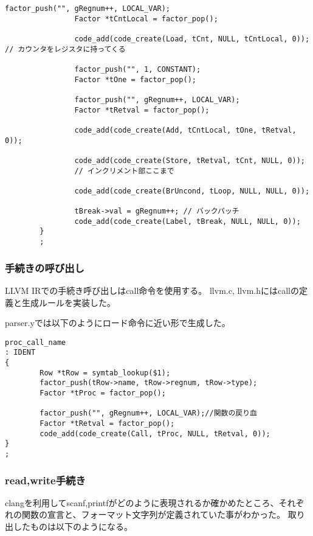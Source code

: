\begin{lstlisting}[caption={for文の生成箇所},label={for文の生成箇所}]
                factor_push("", gRegnum++, LOCAL_VAR);
                Factor *tCntLocal = factor_pop();

                code_add(code_create(Load, tCnt, NULL, tCntLocal, 0)); // カウンタをレジスタに持ってくる

                factor_push("", 1, CONSTANT);
                Factor *tOne = factor_pop();

                factor_push("", gRegnum++, LOCAL_VAR);
                Factor *tRetval = factor_pop();

                code_add(code_create(Add, tCntLocal, tOne, tRetval, 0));

                code_add(code_create(Store, tRetval, tCnt, NULL, 0));
                // インクリメント部ここまで

                code_add(code_create(BrUncond, tLoop, NULL, NULL, 0));

                tBreak->val = gRegnum++; // バックパッチ
                code_add(code_create(Label, tBreak, NULL, NULL, 0));
        }
        ;
\end{lstlisting}

\subsubsection{手続きの呼び出し}
LLVM IRでの手続き呼び出しはcall命令を使用する。
llvm.c, llvm.hにはcallの定義と生成ルールを実装した。

parser.yでは以下のようにロード命令に近い形で生成した。

\begin{lstlisting}[caption={手続きの呼び出し生成部分},label={手続きの呼び出し生成部分}]
proc_call_name
: IDENT
{
        Row *tRow = symtab_lookup($1);
        factor_push(tRow->name, tRow->regnum, tRow->type);
        Factor *tProc = factor_pop();

        factor_push("", gRegnum++, LOCAL_VAR);//関数の戻り血
        Factor *tRetval = factor_pop();
        code_add(code_create(Call, tProc, NULL, tRetval, 0));
}
;
\end{lstlisting}

\subsubsection{read,write手続き}
clangを利用してscanf,printfがどのように表現されるか確かめたところ、それぞれの関数の宣言と、フォーマット文字列が定義されていた事がわかった。
取り出したものは以下のようになる。

